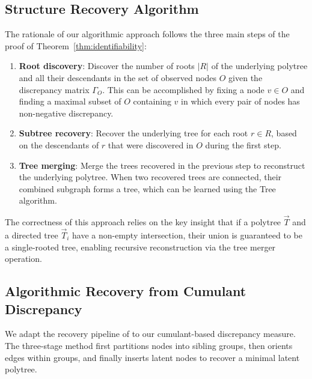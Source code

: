 \documentclass[11pt,a4paper]{article}
\numberwithin{equation}{section}
\begin{document}
\subsection{Structure Recovery Algorithm}

The rationale of our algorithmic approach follows the three main steps of the proof of Theorem~\ref{thm:identifiability}:

\begin{enumerate}[label=(\arabic*)]
\item \textbf{Root discovery}: Discover the number of roots $|R|$ of the underlying polytree and all their descendants in the set of observed nodes $O$ given the discrepancy matrix $\Gamma_O$. This can be accomplished by fixing a node $v \in O$ and finding a maximal subset of $O$ containing $v$ in which every pair of nodes has non-negative discrepancy.

\item \textbf{Subtree recovery}: Recover the underlying tree for each root $r \in R$, based on the descendants of $r$ that were discovered in $O$ during the first step.

\item \textbf{Tree merging}: Merge the trees recovered in the previous step to reconstruct the underlying polytree. When two recovered trees are connected, their combined subgraph forms a tree, which can be learned using the Tree algorithm.
\end{enumerate}

The correctness of this approach relies on the key insight that if a polytree $\vec{T}$ and a directed tree $\vec{T}_i$ have a non-empty intersection, their union is guaranteed to be a single-rooted tree, enabling recursive reconstruction via the tree merger operation.


\subsection{Algorithmic Recovery from Cumulant Discrepancy}

We adapt the recovery pipeline of \citet{etesami:kiyavash:coleman:2016} to our cumulant-based discrepancy measure. The three-stage method first partitions nodes into sibling groups, then orients edges within groups, and finally inserts latent nodes to recover a minimal latent polytree.

\vspace{1ex}
\end{document}
